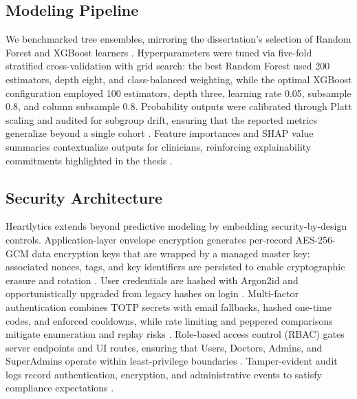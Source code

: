 \documentclass[12pt]{article}
\begin{document}
\subsection{Modeling Pipeline}
We benchmarked tree ensembles, mirroring the dissertation's selection of Random Forest and XGBoost learners \cite{breiman2001random, chen2016xgboost}. Hyperparameters were tuned via five-fold stratified cross-validation with grid search: the best Random Forest used 200 estimators, depth eight, and class-balanced weighting, while the optimal XGBoost configuration employed 100 estimators, depth three, learning rate 0.05, subsample 0.8, and column subsample 0.8. Probability outputs were calibrated through Platt scaling and audited for subgroup drift, ensuring that the reported metrics generalize beyond a single cohort \cite{platt1999probabilistic, kohavi1995study}. Feature importances and SHAP value summaries contextualize outputs for clinicians, reinforcing explainability commitments highlighted in the thesis \cite{lundberg2017unified}.

\subsection{Security Architecture}
Heartlytics extends beyond predictive modeling by embedding security-by-design controls. Application-layer envelope encryption generates per-record AES-256-GCM data encryption keys that are wrapped by a managed master key; associated nonces, tags, and key identifiers are persisted to enable cryptographic erasure and rotation \cite{dworkin2007recommendation, googlekms, awskms}. User credentials are hashed with Argon2id and opportunistically upgraded from legacy hashes on login \cite{biryukov2015argon2, provos1999bcrypt}. Multi-factor authentication combines TOTP secrets with email fallbacks, hashed one-time codes, and enforced cooldowns, while rate limiting and peppered comparisons mitigate enumeration and replay risks \cite{grassi2017digital, mraihi2011totp, owasp2021}. Role-based access control (RBAC) gates server endpoints and UI routes, ensuring that Users, Doctors, Admins, and SuperAdmins operate within least-privilege boundaries \cite{ferraiolo2001proposed}. Tamper-evident audit logs record authentication, encryption, and administrative events to satisfy compliance expectations \cite{howard2006security, shostack2014threat}.
\end{document}
